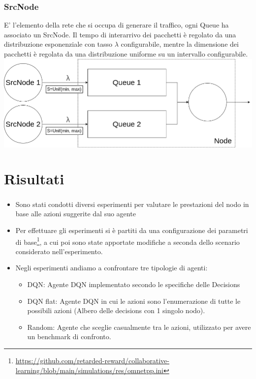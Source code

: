 \documentclass[compress]{beamer}
\begin{document}
\subsubsection{SrcNode}
\begin{frame}{\subsubsecname}
    E' l'elemento della rete che si occupa di generare il traffico, ogni Queue ha associato un SrcNode.
    Il tempo di interarrivo dei pacchetti è regolato da una distribuzione esponenziale con tasso $\lambda$ configurabile, mentre la dimensione dei pacchetti è regolata da una distribuzione uniforme su un intervallo configurabile.
    \begin{adjustbox}{margin=0.5cm 0cm 0.5cm 0.5cm, center} %
        \includegraphics[width=.8\textwidth]{figs/src_scheme.png}
    \end{adjustbox}
\end{frame}


\section{Risultati}
\begin{frame}
    \frametitle{\secname}
    \begin{itemize}
        \item Sono stati condotti diversi esperimenti per valutare le prestazioni del nodo in base 
        alle azioni suggerite dal suo agente
        \item Per effettuare gli esperimenti si è partiti da una configurazione dei parametri di 
        base\footnote{\href{https://github.com/retarded-reward/collaborative-learning/blob/main/simulations/res/omnetpp.ini}{https://github.com/retarded-reward/collaborative-learning/blob/main/simulations/res/omnetpp.ini}},
        a cui poi sono state apportate modifiche a seconda dello scenario considerato
        nell'esperimento.
        \item Negli esperimenti andiamo a confrontare tre tipologie di agenti:
        \begin{itemize}
            \item DQN: Agente DQN implementato secondo le specifiche delle Decisions
            \item DQN flat: Agente DQN in cui le azioni sono l'enumerazione di tutte
             le possibili azioni (Albero delle decisions con 1 singolo nodo). 
            \item Random: Agente che sceglie casualmente tra le azioni,
             utilizzato per avere un benchmark di confronto.
        \end{itemize}
    \end{itemize}
\end{frame}
\end{document}
